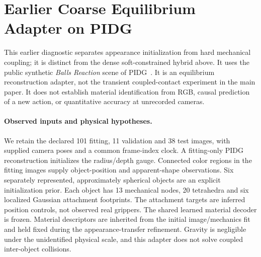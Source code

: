 \section{Earlier Coarse Equilibrium Adapter on PIDG}
\label{sec:pidg-rendering}
This earlier diagnostic separates appearance initialization from hard mechanical coupling; it is distinct from the dense soft-constrained hybrid above. It uses the public synthetic \emph{Balls Reaction} scene of PIDG~\cite{hong2026pidg}. It is an equilibrium reconstruction adapter, not the transient coupled-contact experiment in the main paper. It does not establish material identification from RGB, causal prediction of a new action, or quantitative accuracy at unrecorded cameras.

\paragraph{Observed inputs and physical hypotheses.}
We retain the declared 101 fitting, 11 validation and 38 test images, with supplied camera poses and a common frame-index clock. A fitting-only PIDG reconstruction initializes the radius/depth gauge. Connected color regions in the fitting images supply object-position and apparent-shape observations. Six separately represented, approximately spherical objects are an explicit initialization prior. Each object has 13 mechanical nodes, 20 tetrahedra and six localized Gaussian attachment footprints. The attachment targets are inferred position controls, not observed real grippers. The shared learned material decoder is frozen. Material descriptors are inherited from the initial image/mechanics fit and held fixed during the appearance-transfer refinement. Gravity is negligible under the unidentified physical scale, and this adapter does not solve coupled inter-object collisions.

